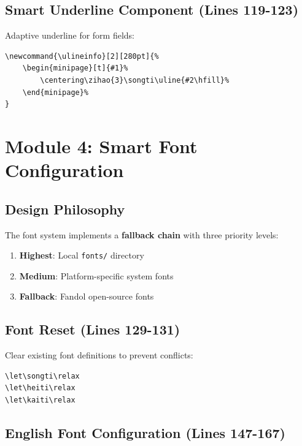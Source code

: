 \documentclass[linux]{hustreport}
\begin{document}
\subsection{Smart Underline Component (Lines 119-123)}

Adaptive underline for form fields:

\begin{verbatim}
\newcommand{\ulineinfo}[2][280pt]{%
    \begin{minipage}[t]{#1}%
        \centering\zihao{3}\songti\uline{#2\hfill}%
    \end{minipage}%
}
\end{verbatim}

\newpage
\section{Module 4: Smart Font Configuration}

\subsection{Design Philosophy}

The font system implements a \textbf{fallback chain} with three priority levels:

\begin{enumerate}
    \item \textbf{Highest}: Local \texttt{fonts/} directory
    \item \textbf{Medium}: Platform-specific system fonts
    \item \textbf{Fallback}: Fandol open-source fonts
\end{enumerate}

\subsection{Font Reset (Lines 129-131)}

Clear existing font definitions to prevent conflicts:

\begin{verbatim}
\let\songti\relax
\let\heiti\relax
\let\kaiti\relax
\end{verbatim}

\subsection{English Font Configuration (Lines 147-167)}
\end{document}
